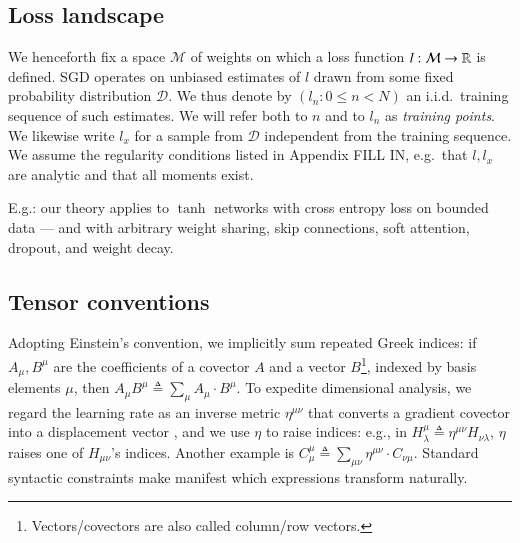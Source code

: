 \documentclass{article}
\theoremstyle{plain}
\theoremstyle{definition}
\newcommand{\Dd}{\mathcal{D}}
\newcommand{\Mm}{\mathcal{M}}
\begin{document}

    \subsection{Loss landscape}


        We henceforth fix a space $\Mm$ of weights on which a loss function
        $l:\Mm\to\RR$ is defined.  SGD operates on unbiased estimates of $l$
        drawn from some fixed probability distribution $\Dd$.  We thus denote
        by $(l_n: 0\leq n<N)$ an i.i.d.\ training sequence of such estimates.
        We will refer both to $n$ and to $l_n$ as \emph{training points}.  We
        likewise write $l_x$ for a sample from $\Dd$ independent from the
        training sequence.   We assume the regularity conditions listed in
        Appendix {\color{red} FILL IN}, e.g.\ that $l, l_x$ are analytic and
        that all moments exist.


        E.g.: our theory applies to $\tanh$ networks with cross entropy
        loss on bounded data --- and with arbitrary weight sharing, skip
        connections, soft attention, dropout, and weight decay.
        

    \subsection{Tensor conventions}
        Adopting Einstein's convention, we implicitly sum repeated Greek
        indices: if $A_\mu, B^\mu$ are the coefficients of a covector $A$ and a
        vector $B$\footnote{
            Vectors/covectors are also called column/row vectors.
        }, indexed by basis elements $\mu$, then
        $
            A_\mu B^\mu
            \triangleq
            \sum_\mu A_\mu \cdot B^\mu
        $.
        To expedite dimensional analysis, we regard the learning rate as an
        inverse metric $\eta^{\mu\nu}$ that converts a gradient covector into a
        displacement vector \citep{bo13}, and we use $\eta$ to raise indices:
        e.g., in
        $
            H^{\mu}_{\lambda}
            \triangleq
            \eta^{\mu\nu} H_{\nu\lambda}
        $,
        $\eta$ raises one of $H_{\mu\nu}$'s indices.  Another example is
        $
            C^{\mu}_{\mu}
            \triangleq
            \sum_{\mu \nu} \eta^{\mu\nu} \cdot C_{\nu\mu}
        $.
        Standard syntactic constraints make manifest which expressions
        transform naturally.%
\end{document}
